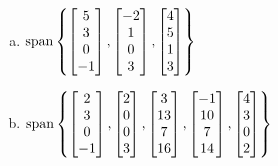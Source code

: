 \begin{applicationActivities}{3}{14}
\begin{activity}{15}
\begin{multicols}{3}
\begin{enumerate}[a)]
    \item \(\operatorname{span}\left\{
    \begin{bmatrix}5\\3\\0\\-1\end{bmatrix},
    \begin{bmatrix}-2\\1\\0\\3\end{bmatrix},
    \begin{bmatrix}4\\5\\1\\3\end{bmatrix}
    \right\}
    \)

    \item \(\operatorname{span}\left\{
    \begin{bmatrix}2\\3\\0\\-1\end{bmatrix},
    \begin{bmatrix}2\\0\\0\\3\end{bmatrix},
    \begin{bmatrix}3\\13\\7\\16\end{bmatrix},
    \begin{bmatrix}-1\\10\\7\\14\end{bmatrix},
    \begin{bmatrix}4\\3\\0\\2\end{bmatrix}
    \right\}
    \)


\end{enumerate}
\end{multicols}
\end{activity}
\end{applicationActivities}
